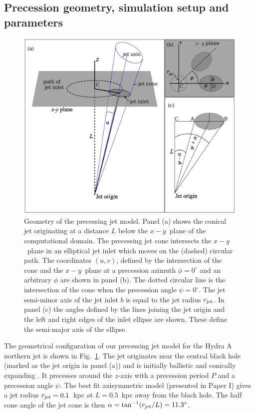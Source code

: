 \documentclass[useAMS, usenatbib]{mn2e}
\begin{document}
\subsection{Precession geometry, simulation setup and parameters}
\begin{figure}
\centering
\includegraphics[width=\linewidth]{fig2.eps}
\caption{Geometry of the precessing jet model. Panel (a) shows  the conical jet originating at a distance $L$ below the $x-y$~plane of the computational domain. The precessing jet cone intersects the $x-y$~plane in an elliptical jet inlet which moves on the (dashed) circular path. The coordinates $(u,v)$, defined by the intersection of the cone and the $x-y$~plane at a precession azimuth $\phi = 0^{\circ}$ and an arbitrary $\phi$ are shown in panel (b). The dotted circular line is the intersection of the cone when the precession angle $\psi = 0^{\circ}$.
The jet semi-minor axis of the jet inlet $b$ is equal to the jet radius $r_{\rm jet}$.  In panel (c) the angles defined by the lines joining the jet origin and the left and right edges of the inlet ellipse are shown. These define the semi-major axis of the ellipse.}
\label{f:mod}
\end{figure}
The geometrical configuration of our precessing jet model for the Hydra A northern jet is shown in Fig.~\ref{f:mod}.  The jet originates near the central black hole (marked as the jet origin in panel (a)) and is initially ballistic and conically expanding \citep{komissarov98, krause12, nawaz14a}. It precesses around the $z$-axis with a precession period $P$ and a precession angle $\psi$. The best fit axisymmetric model (presented in Paper I) gives a jet radius $r_{\rm jet} = 0.1$~kpc at $L=0.5$~kpc away from the black hole. The half cone angle of the jet cone is then $\alpha = \tan^{-1}(r_{\rm jet}/L) = 11.3^{\circ}$.
\end{document}
